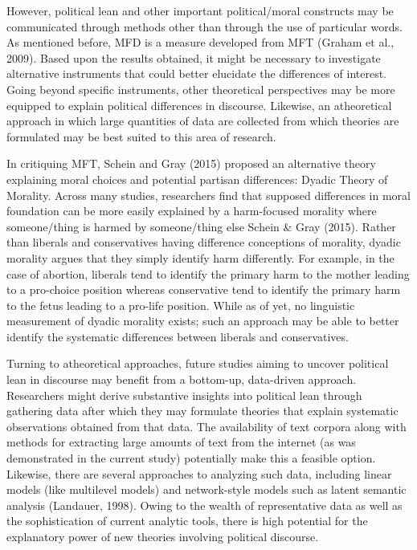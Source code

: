 \documentclass[
  english,
  man]{apa6}
\begin{document}
However, political lean and other important political/moral constructs may be communicated through methods other than through the use of particular words. As mentioned before, MFD is a measure developed from MFT (Graham et al., 2009). Based upon the results obtained, it might be necessary to investigate alternative instruments that could better elucidate the differences of interest. Going beyond specific instruments, other theoretical perspectives may be more equipped to explain political differences in discourse. Likewise, an atheoretical approach in which large quantities of data are collected from which theories are formulated may be best suited to this area of research.

In critiquing MFT, Schein and Gray (2015) proposed an alternative theory explaining moral choices and potential partisan differences: Dyadic Theory of Morality. Across many studies, researchers find that supposed differences in moral foundation can be more easily explained by a harm-focused morality where someone/thing is harmed by someone/thing else Schein \& Gray (2015). Rather than liberals and conservatives having difference conceptions of morality, dyadic morality argues that they simply identify harm differently. For example, in the case of abortion, liberals tend to identify the primary harm to the mother leading to a pro-choice position whereas conservative tend to identify the primary harm to the fetus leading to a pro-life position. While as of yet, no linguistic measurement of dyadic morality exists; such an approach may be able to better identify the systematic differences between liberals and conservatives.

Turning to atheoretical approaches, future studies aiming to uncover political lean in discourse may benefit from a bottom-up, data-driven approach. Researchers might derive substantive insights into political lean through gathering data after which they may formulate theories that explain systematic observations obtained from that data. The availability of text corpora along with methods for extracting large amounts of text from the internet (as was demonstrated in the current study) potentially make this a feasible option. Likewise, there are several approaches to analyzing such data, including linear models (like multilevel models) and network-style models such as latent semantic analysis (Landauer, 1998). Owing to the wealth of representative data as well as the sophistication of current analytic tools, there is high potential for the explanatory power of new theories involving political discourse.
\end{document}
